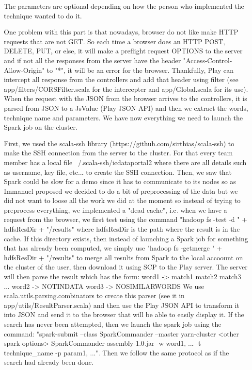 \documentclass{article}
\begin{document}
The parameters are optional depending on how the person who implemented the technique wanted to do it.

One problem with this part is that nowadays, browser do not like make HTTP requests that are not GET.
So each time a browser does an HTTP POST, DELETE, PUT, or else, it will make a preflight request OPTIONS to the server and if not all the responses from the server have the header "Access-Control-Allow-Origin" to "*", it will be an error for the browser.
Thankfully, Play can intercept all response from the controllers and add that header using filter (see app/filters/CORSFilter.scala for the intercepter and app/Global.scala for its use).
When the request with the JSON from the browser arrives to the controllers, it is parsed from JSON to a JsValue (Play JSON API) and then we extract the words, technique name and parameters.
We have now everything we need to launch the Spark job on the cluster.

First, we used the scala-ssh library (https://github.com/sirthias/scala-ssh) to make the SSH connection from the server to the cluster.
For that every team member has a local file ~/.scala-ssh/icdataportal2 where there are all details such as username, key file, etc... to create the SSH connection.
Then, we saw that Spark could be slow for a demo since it has to communicate to its nodes so as Immanuel proposed we decided to do a bit of preprocessing of the data but we did not want to loose all the work we did at the moment so instead of trying to preprocess everything, we implemented a "dead cache", i.e. when we have a request from the browser, we first test using the command "hadoop fs -test -d " + hdfsResDir + "/results" where hdfsResDir is the path where the result is in the cache. 
If this directory exists, then instead of launching a Spark job for something that has already been computed, we simply use "hadoop fs -getmerge " + hdfsResDir + "/results" to merge all results from Spark to the local accoount on the cluster of the user, then download it using SCP to the Play server.
The server will then parse the result which has the form:
word1 -> match1 match2 match3 ...
word2 -> NOTINDATA
word3 -> NOSIMILARWORDS
We use scala.utils.parsing.combinators to create this parser (see it in app/utils/ResultParser.scala) and then use the Play JSON API to transform it into JSON and send it to the browser that will be able to easily display it.
If the search has never been attempted, then we launch the spark job using the command: "spark-submit --class SparkCommander --master yarn-cluster <other spark options> SparkCommander-assembly-1.0.jar -w word1, ... -t technique_name -p param1, ...".
Then we follow the same protocol as if the search had already been done.
\end{document}
